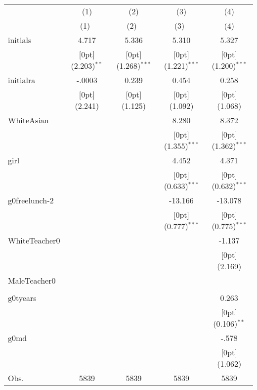 \begin{tabular*}{\textwidth}{@{\extracolsep{\fill}}lcccc}				
	& \multicolumn{1}{c}{(1)} &	\multicolumn{1}{c}{(2)} &	\multicolumn{1}{c}{(3)} &	\multicolumn{1}{c}{(4)} \\
\cline{2-5}				
	& \multicolumn{1}{c}{(1)\mbox{\ }} &	\multicolumn{1}{c}{(2)\mbox{\ }} &	\multicolumn{1}{c}{(3)\mbox{\ }} &	\multicolumn{1}{c}{(4)} \\
\hline				
initials &	4.717 &	5.336 &	5.310 &	5.327 \\
&	\raisebox{.7ex}[0pt]{\scriptsize (2.203)$^{**}$} &	\raisebox{.7ex}[0pt]{\scriptsize (1.268)$^{***}$} &	\raisebox{.7ex}[0pt]{\scriptsize (1.221)$^{***}$} &	\raisebox{.7ex}[0pt]{\scriptsize (1.200)$^{***}$} \\
initialra &	-.0003 &	0.239 &	0.454 &	0.258 \\
&	\raisebox{.7ex}[0pt]{\scriptsize (2.241)} &	\raisebox{.7ex}[0pt]{\scriptsize (1.125)} &	\raisebox{.7ex}[0pt]{\scriptsize (1.092)} &	\raisebox{.7ex}[0pt]{\scriptsize (1.068)} \\
WhiteAsian &	&	&	8.280 &	8.372 \\
&	&	&	\raisebox{.7ex}[0pt]{\scriptsize (1.355)$^{***}$} &	\raisebox{.7ex}[0pt]{\scriptsize (1.362)$^{***}$} \\
girl &	&	&	4.452 &	4.371 \\
&	&	&	\raisebox{.7ex}[0pt]{\scriptsize (0.633)$^{***}$} &	\raisebox{.7ex}[0pt]{\scriptsize (0.632)$^{***}$} \\
g0freelunch-2 &	&	&	-13.166 &	-13.078 \\
&	&	&	\raisebox{.7ex}[0pt]{\scriptsize (0.777)$^{***}$} &	\raisebox{.7ex}[0pt]{\scriptsize (0.775)$^{***}$} \\
WhiteTeacher0 &	&	&	&	-1.137 \\
&	&	&	&	\raisebox{.7ex}[0pt]{\scriptsize (2.169)} \\
MaleTeacher0 &	&	&	&	\\
&	&	&	&	\\
g0tyears &	&	&	&	0.263 \\
&	&	&	&	\raisebox{.7ex}[0pt]{\scriptsize (0.106)$^{**}$} \\
g0md &	&	&	&	-.578 \\
&	&	&	&	\raisebox{.7ex}[0pt]{\scriptsize (1.062)} \\
Obs. &	5839 &	5839 &	5839 &	5839 \\
\hline\hline				
\end{tabular*}%
